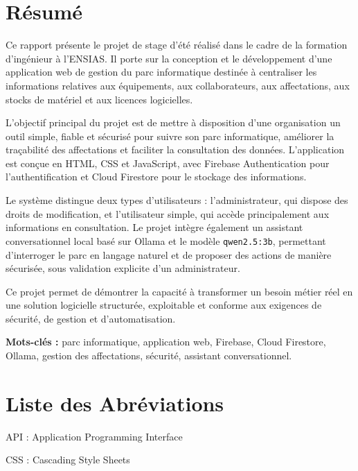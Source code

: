\documentclass{rapportENSIAS}
\begin{document}
\newpage
\chapter*{Résumé}

Ce rapport présente le projet de stage d’été réalisé dans le cadre de la formation d’ingénieur à l’ENSIAS. Il porte sur la conception et le développement d’une application web de gestion du parc informatique destinée à centraliser les informations relatives aux équipements, aux collaborateurs, aux affectations, aux stocks de matériel et aux licences logicielles.

L’objectif principal du projet est de mettre à disposition d’une organisation un outil simple, fiable et sécurisé pour suivre son parc informatique, améliorer la traçabilité des affectations et faciliter la consultation des données. L’application est conçue en HTML, CSS et JavaScript, avec Firebase Authentication pour l’authentification et Cloud Firestore pour le stockage des informations.

Le système distingue deux types d’utilisateurs : l’administrateur, qui dispose des droits de modification, et l’utilisateur simple, qui accède principalement aux informations en consultation. Le projet intègre également un assistant conversationnel local basé sur Ollama et le modèle \texttt{qwen2.5:3b}, permettant d’interroger le parc en langage naturel et de proposer des actions de manière sécurisée, sous validation explicite d’un administrateur.

Ce projet permet de démontrer la capacité à transformer un besoin métier réel en une solution logicielle structurée, exploitable et conforme aux exigences de sécurité, de gestion et d’automatisation.

\vspace{0.5cm}
\noindent\textbf{Mots-clés :} parc informatique, application web, Firebase, Cloud Firestore, Ollama, gestion des affectations, sécurité, assistant conversationnel.


\newpage
\chapter*{Liste des Abréviations}


API : Application Programming Interface

CSS : Cascading Style Sheets
\end{document}
